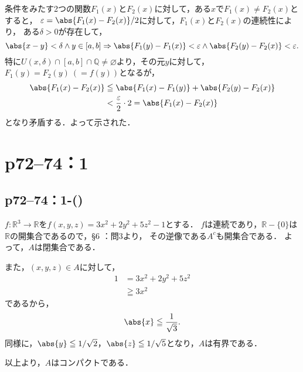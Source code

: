 \begin{tproof}
    条件をみたす2つの関数$F_1 (x)$と$F_2(x)$に対して，ある$x$で$F_1(x) \ne F_2(x)$とすると，
    $\varepsilon = \abs{F_1(x) - F_2(x)}/2$に対して，$F_1(x)$と$F_2(x)$の連続性により，
    ある$\delta >0$が存在して，
    \[
        \abs{x-y}<\delta \land y \in [a,b] \Rightarrow \abs{F_1(y)-F_1(x)}<\varepsilon \land  \abs{F_2(y)-F_2(x)}<\varepsilon.
    \]
    特に$ U (x,\delta) \cap [a,b] \cap \mathbb{Q} \ne \varnothing$より，その元$y$に対して，
    $F_1 (y)=F_2(y)~(=f(y))$となるが，
    \begin{align*}
        \abs{F_1(x)-F_2(x)} & \leqq \abs{F_1(x)-F_1(y)} + \abs{F_2(y)-F_2(x)}          \\
                            & < \frac{\varepsilon}{2} \cdot 2  = \abs{F_1(x) - F_2(x)}
    \end{align*}
    となり矛盾する．よって示された．
\end{tproof}

\newpage

\section*{p72--74：1}


\subsection*{p72--74：1-()}

\begin{tanswer}
    $ f\colon \mathbb{R}^3 \to \mathbb{R}$を$f(x,y,z)=3x^2 + 2y^2 + 5z^2 -1$とする．
    $f$は連続であり，$\mathbb{R} -\{ 0 \}$は$\mathbb{R}$の開集合であるので，\S 6 ：問3より，
    その逆像である$A^c$も開集合である．
    よって，$A$は閉集合である．

    また，$(x,y,z) \in A$に対して，
    \begin{align*}
        1 & = 3x^2 + 2y^2 + 5z^2 \\
          & \geqq 3x^2
    \end{align*}
    であるから，
    \[
        \abs{x} \leqq \frac{1}{\sqrt{3}}.
    \]
    同様に，$ \abs{y} \leqq 1/\sqrt{2}$，$\abs{z} \leqq 1/\sqrt{5}$となり，$A$は有界である．

    以上より，$A$はコンパクトである．
\end{tanswer}


